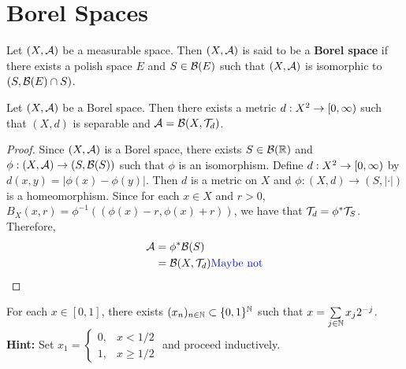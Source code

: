 \documentclass{book}
\begin{document}
	
	
	
	
	
	
	
	
	
	
	
	
	
	
	
	
	
	
	
	
	
	
	
	
	
	
	
	
	
	
	
	
	
	
	
	\newpage
	\section{Borel Spaces}
	
	\begin{defn}  
		Let $(X, \mathcal{A})$ be a measurable space. Then $(X, \mathcal{A})$ is said to be a \textbf{Borel space} if there exists a polish space $E$ and $S \in \mathcal{B}(E)$ such that $(X, \mathcal{A})$ is isomorphic to $(S, \mathcal{B}(E) \cap S)$.
	\end{defn}
	
	\begin{ex}
		Let $(X, \mathcal{A})$ be a Borel space. Then there exists a metric $d:X^2 \rightarrow [0,\infty)$ such that $(X, d)$ is separable and $\mathcal{A} = \mathcal{B}(X, \mathcal{T}_{d})$.
	\end{ex}
	
	\begin{proof}
		Since $(X, \mathcal{A})$ is a Borel space, there exists $S \in \mathcal{B}(\mathbb{R})$ and $\phi: (X, \mathcal{A}) \rightarrow (S, \mathcal{B}(S))$ such that $\phi$ is an isomorphism. Define $d: X^2 \rightarrow [0,\infty)$ by $d(x,y) = |\phi(x) - \phi(y)|$. Then $d$ is a metric on $X$ and $\phi: (X, d) \rightarrow (S, |\cdot|)$ is a homeomorphism. Since for each $x \in X$ and $r > 0$, $B_X(x, r) = \phi^{-1}((\phi(x) - r, \phi(x) + r))$, we have that $\mathcal{T}_d = \phi^*\mathcal{T}_{S}$. Therefore, 
		\begin{align*}
			\mathcal{A} 
			& = \phi^* \mathcal{B}(S) \\
			& = \mathcal{B}(X, \mathcal{T}_d)  \text{\textcolor{blue}{ Maybe not}}
		\end{align*} 
		
	\end{proof}
	
	\begin{ex}  
		For each $x \in [0, 1]$, there exists $(x_n)_{n \in \mathbb{N}} \subset \{0,1\}^{\mathbb{N}}$ such that $x = \sum\limits_{j \in \mathbb{N}} x_j2^{-j}$.
		\textbf{Hint:} Set $x_1 = 
		\begin{cases}
			0, & x < 1/2 \\
			1, & x \geq 1/2 
		\end{cases}$
		and proceed inductively. 
	\end{ex}
	
\end{document}

